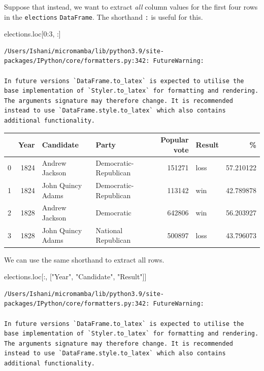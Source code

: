 \documentclass[
  letterpaper,
  DIV=11,
  numbers=noendperiod]{scrreprt}
\newenvironment{Shaded}{\begin{snugshade}}{\end{snugshade}}
\newcommand{\DecValTok}[1]{\textcolor[rgb]{0.68,0.00,0.00}{#1}}
\newcommand{\NormalTok}[1]{\textcolor[rgb]{0.00,0.23,0.31}{#1}}
\newcommand{\StringTok}[1]{\textcolor[rgb]{0.13,0.47,0.30}{#1}}
\begin{document}
Suppose that instead, we want to extract \emph{all} column values for
the first four rows in the \texttt{elections} \texttt{DataFrame}. The
shorthand \texttt{:} is useful for this.

\begin{Shaded}
\begin{Highlighting}[]
\NormalTok{elections.loc[}\DecValTok{0}\NormalTok{:}\DecValTok{3}\NormalTok{, :]}
\end{Highlighting}
\end{Shaded}

\begin{verbatim}
/Users/Ishani/micromamba/lib/python3.9/site-packages/IPython/core/formatters.py:342: FutureWarning:

In future versions `DataFrame.to_latex` is expected to utilise the base implementation of `Styler.to_latex` for formatting and rendering. The arguments signature may therefore change. It is recommended instead to use `DataFrame.style.to_latex` which also contains additional functionality.
\end{verbatim}

\begin{tabular}{lrllrlr}
\toprule
{} &  Year &          Candidate &                  Party &  Popular vote & Result &          \% \\
\midrule
0 &  1824 &     Andrew Jackson &  Democratic-Republican &        151271 &   loss &  57.210122 \\
1 &  1824 &  John Quincy Adams &  Democratic-Republican &        113142 &    win &  42.789878 \\
2 &  1828 &     Andrew Jackson &             Democratic &        642806 &    win &  56.203927 \\
3 &  1828 &  John Quincy Adams &    National Republican &        500897 &   loss &  43.796073 \\
\bottomrule
\end{tabular}

We can use the same shorthand to extract all rows.

\begin{Shaded}
\begin{Highlighting}[]
\NormalTok{elections.loc[:, [}\StringTok{"Year"}\NormalTok{, }\StringTok{"Candidate"}\NormalTok{, }\StringTok{"Result"}\NormalTok{]]}
\end{Highlighting}
\end{Shaded}

\begin{verbatim}
/Users/Ishani/micromamba/lib/python3.9/site-packages/IPython/core/formatters.py:342: FutureWarning:

In future versions `DataFrame.to_latex` is expected to utilise the base implementation of `Styler.to_latex` for formatting and rendering. The arguments signature may therefore change. It is recommended instead to use `DataFrame.style.to_latex` which also contains additional functionality.
\end{verbatim}
\end{document}
